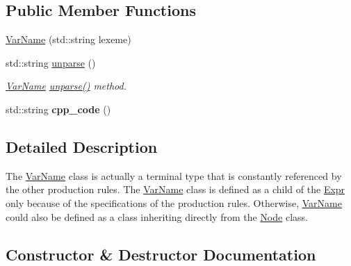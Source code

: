 \subsection*{Public Member Functions}
\begin{DoxyCompactItemize}
\item 
\hyperlink{classfcal_1_1ast_1_1VarName_ae28b56dc49afde5babd49db679e2add7}{Var\+Name} (std\+::string lexeme)
\item 
std\+::string \hyperlink{classfcal_1_1ast_1_1VarName_a7b660e497c976bd9e18f8d631ba8f685}{unparse} ()
\begin{DoxyCompactList}\small\item\em \hyperlink{classfcal_1_1ast_1_1VarName}{Var\+Name} \hyperlink{classfcal_1_1ast_1_1VarName_a7b660e497c976bd9e18f8d631ba8f685}{unparse()} method. \end{DoxyCompactList}\item 
std\+::string {\bfseries cpp\+\_\+code} ()\hypertarget{classfcal_1_1ast_1_1VarName_a3294f5a0d8537918b6d3839d022138bc}{}\label{classfcal_1_1ast_1_1VarName_a3294f5a0d8537918b6d3839d022138bc}

\end{DoxyCompactItemize}


\subsection{Detailed Description}
The \hyperlink{classfcal_1_1ast_1_1VarName}{Var\+Name} class is actually a terminal type that is constantly referenced by the other production rules. The \hyperlink{classfcal_1_1ast_1_1VarName}{Var\+Name} class is defined as a child of the \hyperlink{classfcal_1_1ast_1_1Expr}{Expr} only because of the specifications of the production rules. Otherwise, \hyperlink{classfcal_1_1ast_1_1VarName}{Var\+Name} could also be defined as a class inheriting directly from the \hyperlink{classfcal_1_1ast_1_1Node}{Node} class. 

\subsection{Constructor \& Destructor Documentation}
